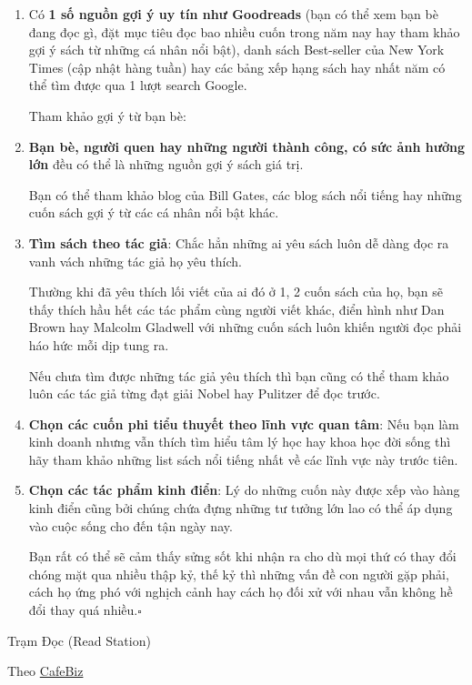 \documentclass{book}
\numberwithin{equation}{section}
\begin{document}
\begin{enumerate}
    \item Có \textbf{1 số nguồn gợi ý uy tín như Goodreads} (bạn có thể xem bạn bè đang đọc gì, đặt mục tiêu đọc bao nhiều cuốn trong năm nay hay tham khảo gợi ý sách từ những cá nhân nổi bật), danh sách Best-seller của New York Times (cập nhật hàng tuần) hay các bảng xếp hạng sách hay nhất năm có thể tìm được qua 1 lượt search Google.
    
    Tham khảo gợi ý từ bạn bè:
    \item \textbf{Bạn bè, người quen hay những người thành công, có sức ảnh hưởng lớn} đều có thể là những nguồn gợi ý sách giá trị.
    
    Bạn có thể tham khảo blog của Bill Gates, các blog sách nổi tiếng hay những cuốn sách gợi ý từ các cá nhân nổi bật khác.
    \item \textbf{Tìm sách theo tác giả}: Chắc hẳn những ai yêu sách luôn dễ dàng đọc ra vanh vách những tác giả họ yêu thích.
    
    Thường khi đã yêu thích lối viết của ai đó ở 1, 2 cuốn sách của họ, bạn sẽ thấy thích hầu hết các tác phẩm cùng người viết khác, điển hình như Dan Brown hay Malcolm Gladwell với những cuốn sách luôn khiến người đọc phải háo hức mỗi dịp tung ra.
    
    Nếu chưa tìm được những tác giả yêu thích thì bạn cũng có thể tham khảo luôn các tác giả từng đạt giải Nobel hay Pulitzer để đọc trước.
    \item \textbf{Chọn các cuốn phi tiểu thuyết theo lĩnh vực quan tâm}: Nếu bạn làm kinh doanh nhưng vẫn thích tìm hiểu tâm lý học hay khoa học đời sống thì hãy tham khảo những list sách nổi tiếng nhất về các lĩnh vực này trước tiên.
    \item \textbf{Chọn các tác phẩm kinh điển}: Lý do những cuốn này được xếp vào hàng kinh điển cũng bởi chúng chứa đựng những tư tưởng lớn lao có thể áp dụng vào cuộc sống cho đến tận ngày nay.
    
    Bạn rất có thể sẽ cảm thấy sửng sốt khi nhận ra cho dù mọi thứ có thay đổi chóng mặt qua nhiều thập kỷ, thế kỷ thì những vấn đề con người gặp phải, cách họ ứng phó với nghịch cảnh hay cách họ đối xử với nhau vẫn không hề đổi thay quá nhiều.\hfill$\square$
\end{enumerate}

\begin{flushright}
    Trạm Đọc (Read Station)
    
    Theo \href{http://cafebiz.vn/doc-sach-rat-tot-nhung-lam-sao-de-biet-do-la-mot-cuon-sach-dang-doc-20160820212051793.chn}{CafeBiz}
\end{flushright}
\end{document}

